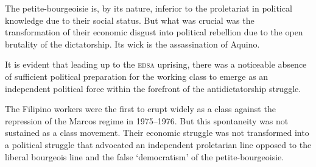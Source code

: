 \documentclass[a4paper,11pt,onesided]{report}
\begin{document}
The petite-bourgeoisie is, by its nature,
inferior to the proletariat 
in political knowledge 
due to their social status. 
But what was crucial was the transformation 
of their economic disgust into political rebellion 
due to the open brutality of the dictatorship. 
Its wick is the assassination of Aquino.

It is evident that leading up to the \textsc{edsa} uprising, 
there was a noticeable absence of 
sufficient political preparation for 
the working class to emerge 
as an independent political force 
within the forefront of the antidictatorship struggle.

The Filipino workers were the first to erupt 
widely as a class against the repression 
of the Marcos regime in 1975--1976. 
But this spontaneity was not sustained as a class movement. 
Their economic struggle was not transformed 
into a political struggle 
that advocated an independent proletarian line 
opposed to the liberal bourgeois line 
and the false `democratism' of the petite-bourgeoisie.
\end{document}
